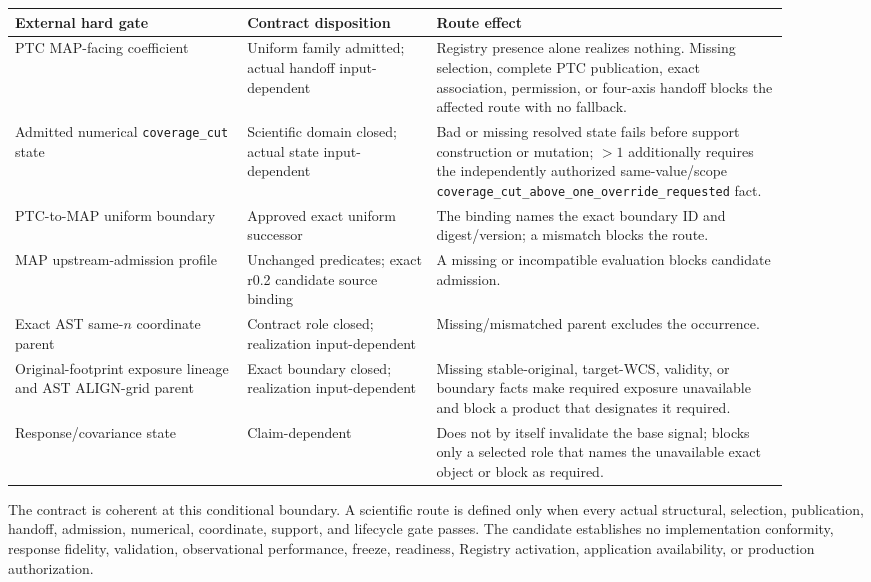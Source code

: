 \documentclass[10pt]{article}
\newcommand{\code}[1]{\nolinkurl{#1}}
\begin{document}
\begin{longtable}{L{0.27\linewidth}L{0.22\linewidth}L{0.41\linewidth}}
\toprule
External hard gate & Contract disposition & Route effect\\
\midrule
PTC MAP-facing coefficient & Uniform family admitted; actual handoff input-dependent & Registry presence alone realizes nothing. Missing selection, complete PTC publication, exact association, permission, or four-axis handoff blocks the affected route with no fallback.\\
Admitted numerical \code{coverage\_cut} state & Scientific domain closed; actual state input-dependent & Bad or missing resolved state fails before support construction or mutation; \(>1\) additionally requires the independently authorized same-value/scope \code{coverage_cut_above_one_override_requested} fact.\\
PTC-to-MAP uniform boundary & Approved exact uniform successor & The binding names the exact boundary ID and digest/version; a mismatch blocks the route.\\
MAP upstream-admission profile & Unchanged predicates; exact r0.2 candidate source binding & A
missing or incompatible \SCIMapUpstreamProfile{} evaluation blocks candidate
admission.\\
Exact AST same-\(n\) coordinate parent & Contract role closed; realization input-dependent & Missing/mismatched parent excludes the occurrence.\\
Original-footprint exposure lineage and AST ALIGN-grid parent & Exact boundary closed; realization input-dependent & Missing stable-original, target-WCS, validity, or boundary facts make required exposure unavailable and block a product that designates it required.\\
Response/covariance state & Claim-dependent & Does not by itself invalidate the base signal; blocks only a selected role that names the unavailable exact object or block as required.\\
\bottomrule
\end{longtable}

The contract is coherent at this conditional boundary. A scientific route is
defined only when every actual structural, selection, publication, handoff,
admission, numerical, coordinate, support, and lifecycle gate passes. The
candidate establishes no implementation conformity, response fidelity,
validation, observational performance, freeze, readiness, Registry activation,
application availability, or production authorization.
\end{document}
